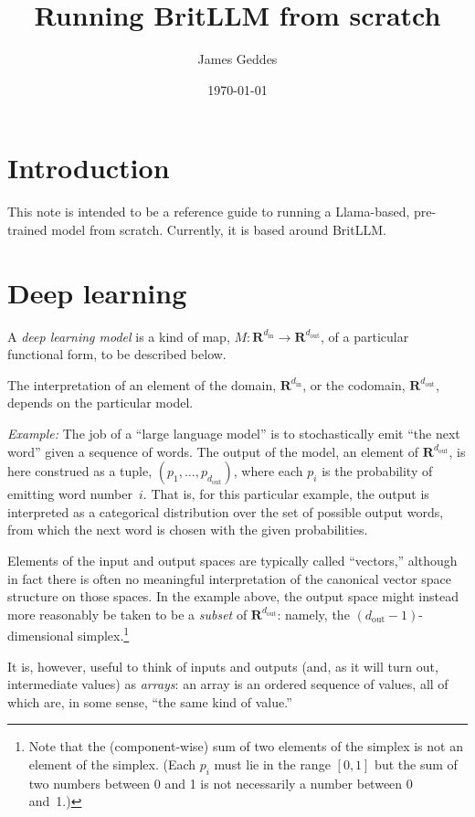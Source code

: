 \documentclass[11pt, a4paper]{article}
\title{Running BritLLM from scratch}
\author{James Geddes}
\date{\today}
\newcommand{\setR}{\mathbold{R}}
\begin{document}
\maketitle

\section{Introduction}

This note is intended to be a reference guide to running a
Llama-based, pre-trained model from scratch. Currently, it is based
around
BritLLM.

\section{Deep learning}
A \emph{deep learning model} is a kind of map,
$M\colon \setR^{d_\text{in}} \to \setR^{d_\text{out}}$, of a particular
functional form, to be described below.

The interpretation of an element of the domain, $\setR^{d_\text{in}}$,
or the codomain, $\setR^{d_\text{out}}$, depends on the particular
model.

\emph{Example:} The job of a ``large language model'' is to
stochastically emit ``the next word'' given a sequence of words. The
output of the model, an element of $\setR^{d_\text{out}}$, is here
construed as a tuple, $(p_1, \dotsc, p_{d_\text{out}})$, where each
$p_i$ is the probability of emitting word number~$i$. That is, for
this particular example, the output is interpreted as a categorical
distribution over the set of possible output words, from which the
next word is chosen with the given probabilities.

Elements of the input and output spaces are typically called
``vectors,'' although in fact there is often no meaningful
interpretation of the canonical vector space structure on those
spaces. In the example above, the output space might instead more
reasonably be taken to be a \emph{subset} of $\setR^{d_\text{out}}$:
namely, the $(d_\text{out}-1)$-dimensional simplex.\footnote{Note that
  the (component-wise) sum of two elements of the simplex is not an
  element of the simplex. (Each $p_i$ must lie in the range $[0,1]$
  but the sum of two numbers between 0 and 1 is not necessarily a
  number between 0 and~1.)}

It is, however, useful to think of inputs and outputs (and, as it will
turn out, intermediate values) as \emph{arrays}: an array is an
ordered sequence of values, all of which are, in some sense, ``the
same kind of value.''
\end{document}
